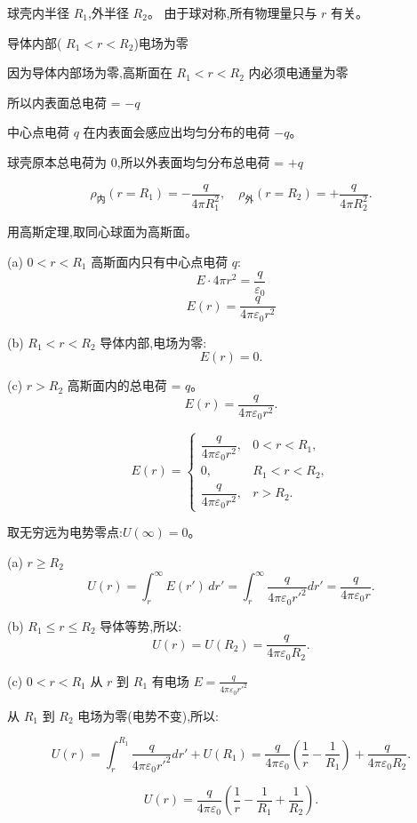 \documentclass{article}
\begin{document}
球壳内半径 $ R_1 $,外半径 $ R_2 $。
由于球对称,所有物理量只与 $ r $ 有关。


导体内部( $ R_1 < r < R_2 $)电场为零

因为导体内部场为零,高斯面在 $ R_1 < r < R_2 $ 内必须电通量为零

所以内表面总电荷 = $-q$

中心点电荷 $ q $ 在内表面会感应出均匀分布的电荷 $ -q $。  

球壳原本总电荷为 0,所以外表面均匀分布总电荷 = $ +q $

$$\rho_{\text{内}}(r=R_1) = -\frac{q}{4\pi R_1^2}, \quad\rho_{\text{外}}(r=R_2) = +\frac{q}{4\pi R_2^2}.$$



用高斯定理,取同心球面为高斯面。

(a) $ 0 < r < R_1 $
高斯面内只有中心点电荷 $ q $:
$$E \cdot 4\pi r^2 = \frac{q}{\varepsilon_0}$$
$$E(r) = \frac{q}{4\pi\varepsilon_0 r^2}$$


(b) $ R_1 < r < R_2 $
导体内部,电场为零:
$$E(r) = 0.$$

(c) $ r > R_2 $
高斯面内的总电荷 =  $ q $。
$$E(r) = \frac{q}{4\pi\varepsilon_0 r^2}.$$



$$
E(r) =
\begin{cases}
\dfrac{q}{4\pi\varepsilon_0 r^2}, & 0 < r < R_1, \\
0, & R_1 < r < R_2, \\
\dfrac{q}{4\pi\varepsilon_0 r^2}, & r > R_2.
\end{cases}
$$



取无穷远为电势零点:$ U(\infty) = 0 $。

(a) $ r \ge R_2 $
$$
U(r) = \int_{r}^{\infty} E(r') \, dr'
= \int_{r}^{\infty} \frac{q}{4\pi\varepsilon_0 r'^2} dr'
= \frac{q}{4\pi\varepsilon_0 r}.
$$

(b) $ R_1 \le r \le R_2 $
导体等势,所以:
$$
U(r) = U(R_2) = \frac{q}{4\pi\varepsilon_0 R_2}.
$$

(c) $ 0 < r < R_1 $
从 $ r $ 到 $ R_1 $ 有电场 $ E = \frac{q}{4\pi\varepsilon_0 r'^2} $

从 $ R_1 $ 到 $ R_2 $ 电场为零(电势不变),所以:

$$
U(r) = \int_{r}^{R_1} \frac{q}{4\pi\varepsilon_0 r'^2} dr' + U(R_1)= \frac{q}{4\pi\varepsilon_0} \left( \frac{1}{r} - \frac{1}{R_1} \right) + \frac{q}{4\pi\varepsilon_0 R_2}.
$$

$$
U(r) = \frac{q}{4\pi\varepsilon_0} \left( \frac{1}{r} - \frac{1}{R_1} + \frac{1}{R_2} \right).
$$
\end{document}
